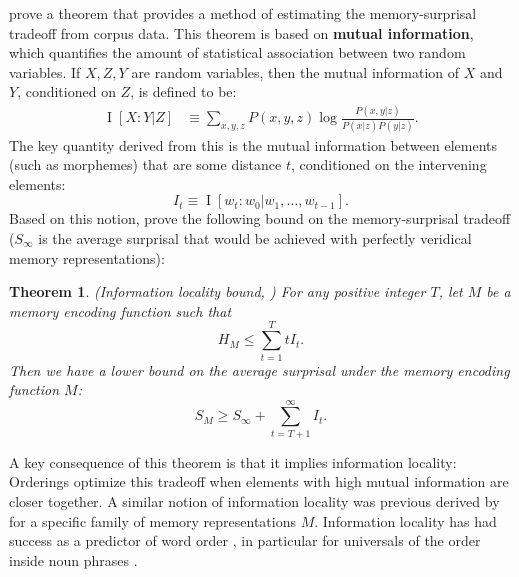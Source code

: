 \documentclass[11pt,letterpaper]{article}
\newcommand{\key}[1]{\textbf{#1}}
\newcounter{theorem}
\newtheorem{thm}[theorem]{Theorem}
\begin{document}
\citet{Hahn2020modeling} prove a theorem that provides a method of estimating the memory-surprisal tradeoff from corpus data.
This theorem is based on \key{mutual information}, which quantifies the amount of statistical association between two random variables.
If $X, Z, Y$ are random variables, then the mutual information of $X$ and $Y$, conditioned on $Z$, is defined to be:
\begin{align}
\label{eq:mi}
    \operatorname{I}[X:Y|Z] &\equiv \sum_{x,y,z} P(x,y,z) \log \frac{P(x,y|z)}{P(x|z)P(y|z)}. %
\end{align}
The key quantity derived from this is the mutual information between elements (such as morphemes) that are some distance $t$, conditioned on the intervening elements:
\begin{equation*}
    I_t \equiv \operatorname{I}[w_t : w_0 | w_1, \dots, w_{t-1}].
\end{equation*}
Based on this notion, \citet{Hahn2020modeling}  prove the following bound on the memory-surprisal tradeoff ($S_\infty$ is the average surprisal that would be achieved with perfectly veridical memory representations):
\begin{thm}\label{prop:suboptimal}(Information locality bound, \citet{Hahn2020modeling})
For any positive integer $T$, let $M$ be a memory encoding function such that
\begin{equation}
\label{eq:memory-bound}
H_M \le \sum_{t=1}^T t I_t.
\end{equation}
Then we have a lower bound on the average surprisal under the memory encoding function $M$:
\begin{equation}
\label{eq:surprisal-bound}
S_M \ge S_\infty + \sum_{t=T+1}^\infty I_t.
\end{equation}
\end{thm}


A key consequence of this theorem is that it implies information locality:
Orderings optimize this tradeoff when elements with high mutual information are closer together.
A similar notion of information locality was previous derived by \citet{futrell2020lossy} for a specific family of memory representations $M$.
Information locality has had success as a predictor of word order \citep{futrell2019information}, in particular for universals of the order inside noun phrases \citep{culbertson2020from,hahn-information-theoretic-2018,DBLP:conf/acl/FutrellDS20}.
\end{document}

